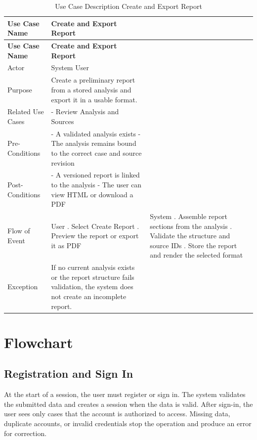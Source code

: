 \begin{longtable}{@{}>{\raggedright\arraybackslash}p{} >{\raggedright\arraybackslash}p{} >{\raggedright\arraybackslash}p{}@{}}
\caption{Use Case Description Create and Export Report}\label{tab:3-8}\\
\toprule
\textbf{Use Case Name} & \textbf{Create and Export Report} & \textbf{} \\
\midrule
\endfirsthead
\textbf{Use Case Name} & \textbf{Create and Export Report} & \textbf{} \\
\midrule
\endhead
Actor & System User &  \\
Purpose & Create a preliminary report from a stored analysis and export it in a usable format. &  \\
Related Use Cases & - Review Analysis and Sources &  \\
Pre-Conditions & - A validated analysis exists \newline - The analysis remains bound to the correct case and source revision &  \\
Post-Conditions & - A versioned report is linked to the analysis \newline - The user can view HTML or download a PDF &  \\
Flow of Event & User \newline 1. Select Create Report \newline 2. Preview the report or export it as PDF & System \newline 1. Assemble report sections from the analysis \newline 2. Validate the structure and source IDs \newline 3. Store the report and render the selected format \\
Exception & If no current analysis exists or the report structure fails validation, the system does not create an incomplete report. &  \\
\bottomrule
\end{longtable}

\section{Flowchart}

\subsection{Registration and Sign In}

At the start of a session, the user must register or sign in. The system validates the submitted data and creates a session when the data is valid. After sign-in, the user sees only cases that the account is authorized to access. Missing data, duplicate accounts, or invalid credentials stop the operation and produce an error for correction.

